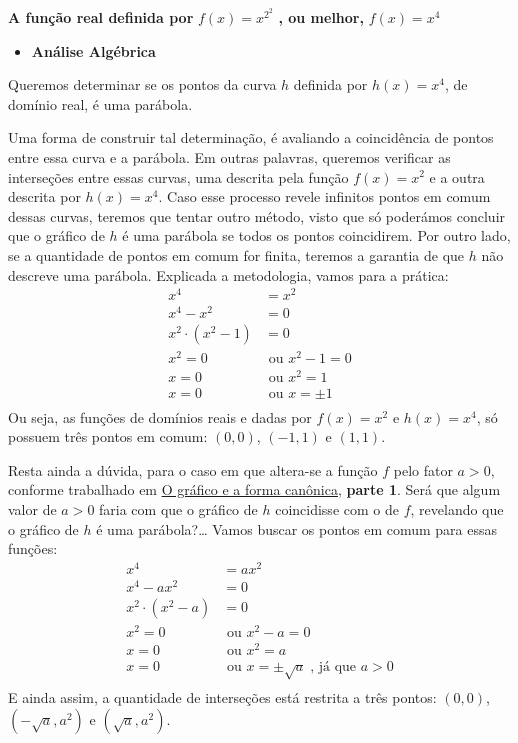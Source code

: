 \textbf{A função real definida por} \(f(x)=x^{2^2}\) \textbf{, ou melhor,} \(f(x)=x^4\)
\begin{itemize}
\item {} 
\textbf{Análise Algébrica}

\end{itemize}

Queremos determinar se os pontos da curva \(h\) definida por \(h(x)=x^4\), de domínio real, é uma parábola.

Uma forma de construir tal determinação, é avaliando a coincidência de pontos entre essa curva e a parábola. Em outras palavras, queremos verificar as interseções entre essas curvas, uma descrita pela função \(f(x) = x^2\) e a outra descrita por \(h(x)=x^4\). Caso esse processo revele infinitos pontos em comum dessas curvas, teremos que tentar outro método, visto que só poderámos concluir que o gráfico de \(h\) é uma parábola se todos os pontos coincidirem. Por outro lado, se a quantidade de pontos em comum for finita, teremos a garantia de que \(h\) não descreve uma parábola. Explicada a metodologia, vamos para a prática:
\begin{equation*}
\begin{split}x^4 & = x^2 \\
x^4-x^2 & = 0 \\
x^2 \cdot (x^2-1) & = 0 \\
x^2 = 0 & \text{ ou } x^2-1=0 \\
x = 0 & \text{ ou } x^2=1 \\
x = 0 & \text{ ou } x = \pm 1 \\\end{split}
\end{equation*}
Ou seja, as funções de domínios reais e dadas por \(f(x)=x^2\) e \(h(x)=x^4\), só possuem três pontos em comum: \((0,0)\), \((-1,1)\) e \((1,1)\).

Resta ainda a dúvida, para o caso em que altera-se a função \(f\) pelo fator \(a>0\), conforme trabalhado em \hyperref[\detokenize{AF209-5:ativ-funcao-quadratica-graf-curva}]{O gráfico e a forma canônica}, \textbf{parte 1}. Será que algum valor de \(a>0\) faria com que o gráfico de \(h\) coincidisse com o de \(f\), revelando que o gráfico de \(h\) é uma parábola?… Vamos buscar os pontos em comum para essas funções:
\begin{equation*}
\begin{split}x^4 & = ax^2 \\
x^4-ax^2 & = 0 \\
x^2 \cdot (x^2-a) & = 0 \\
x^2 = 0 & \text{ ou }  x^2-a=0 \\
x = 0 & \text{ ou }  x^2=a \\
x = 0 & \text{ ou }  x = \pm \sqrt{a}\; \text{, já que }  a>0 \\\end{split}
\end{equation*}
E ainda assim, a quantidade de interseções está restrita a três pontos: \((0,0)\), \((-\sqrt{a},a^2)\) e \((\sqrt{a},a^2)\).

